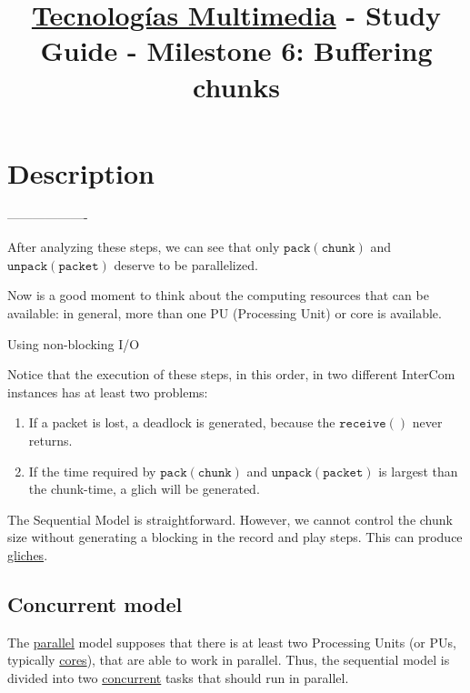 \title{\href{https://www.ual.es/estudios/grados/presentacion/plandeestudios/asignatura/4015/40154321?idioma=zh_CN}{Tecnologías Multimedia} - Study Guide - Milestone 6: Buffering chunks}

\maketitle

\section{Description}
-------------------

After analyzing these steps, we can see that only $\mathtt{pack(chunk)}$ and $\mathtt{unpack(packet)}$ deserve to be parallelized.

Now is a good moment to think about the computing resources that can
be available: in general, more than one PU (Processing Unit) or core is available.

Using non-blocking I/O 
  
Notice that the execution of these steps, in this order, in two
different InterCom instances has at least two problems:
\begin{enumerate}
\item If a packet is lost, a deadlock is generated, because the
  $\mathtt{receive()}$ never returns.
\item If the time required by $\mathtt{pack(chunk)}$ and
  $\mathtt{unpack(packet)}$ is largest than the chunk-time, a glich
  will be generated.
\end{enumerate}

The Sequential Model is straightforward. However, we cannot control
the chunk size without generating a blocking in the record and play
steps. This can produce
\href{https://en.wikipedia.org/wiki/Glitch_(music)}{gliches}.

\subsection{Concurrent model}

The \href{https://en.wikipedia.org/wiki/Parallel_computing}{parallel}
model supposes that there is at least two Processing Units (or PUs,
typically
\href{https://en.wikipedia.org/wiki/Multi-core_processor}{cores}),
that are able to work in parallel. Thus, the sequential model is
divided into two
\href{https://en.wikipedia.org/wiki/Concurrency_(computer_science)}{concurrent}
tasks that should run in parallel.

